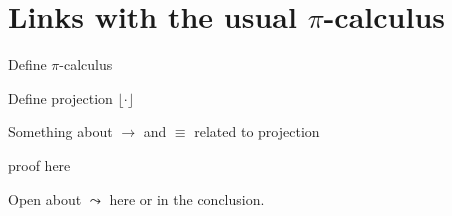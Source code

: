 
\section{Links with the usual $\pi$-calculus}

\begin{definition}
Define $\pi$-calculus
\end{definition}

\begin{definition}
Define projection $\lfloor\cdot\rfloor$
\end{definition}

\begin{proposition}
Something about $\to$ and $\equiv$ related to projection
\end{proposition}

\begin{myproof}
proof here
\end{myproof}

Open about $\leadsto$ here or in the conclusion.